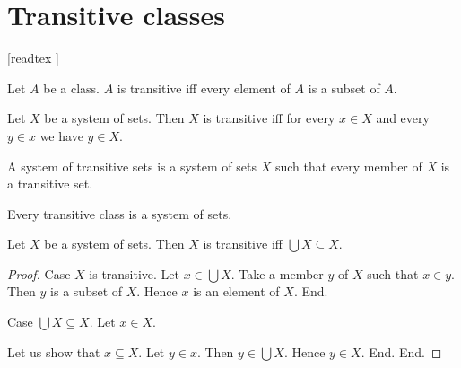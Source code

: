 \documentclass[../set-theory.tex]{subfiles}
\begin{document}
  \chapter{Transitive classes}


  \begin{forthel}

    [readtex ]

  \end{forthel}


  \begin{forthel}
    \begin{definition}
      Let $A$ be a class.
      $A$ is transitive iff every element of $A$ is a subset of $A$.
    \end{definition}
  \end{forthel}

  \begin{forthel}
    \begin{proposition}
      Let $X$ be a system of sets.
      Then $X$ is transitive iff for every $x \in X$ and every $y \in x$ we
      have $y \in X$.
    \end{proposition}
  \end{forthel}

  \begin{forthel}
    \begin{definition}
      A system of transitive sets is a system of sets $X$ such that every member
      of $X$ is a transitive set.
    \end{definition}
  \end{forthel}

  \begin{forthel}
    \begin{proposition}
      Every transitive class is a system of sets.
    \end{proposition}
  \end{forthel}

  \begin{forthel}
    \begin{proposition}
      Let $X$ be a system of sets.
      Then $X$ is transitive iff $\bigcup X \subseteq X$.
    \end{proposition}
    \begin{proof}
      Case $X$ is transitive.
        Let $x \in \bigcup X$.
        Take a member $y$ of $X$ such that $x \in y$.
        Then $y$ is a subset of $X$.
        Hence $x$ is an element of $X$.
      End.

      Case $\bigcup X \subseteq X$.
        Let $x \in X$.

        Let us show that $x \subseteq X$.
          Let $y \in x$.
          Then $y \in \bigcup X$.
          Hence $y \in X$.
        End.
      End.
    \end{proof}
  \end{forthel}
\end{document}
